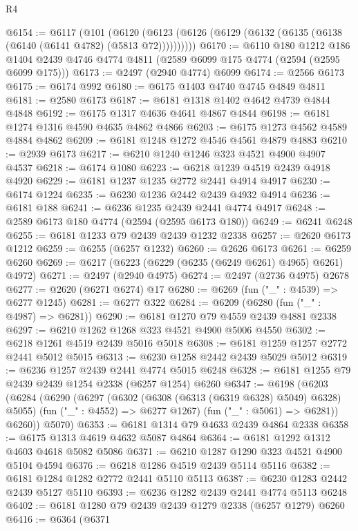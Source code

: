\begin{lexlean}{R4}
\begin{coremodule}
@6154 := @6117
    (@101 (@6120 (@6123 (@6126 (@6129 (@6132 (@6135 (@6138 (@6140 (@6141 @4782) (@5813 @72))))))))))
@6170 := @6110
    @180
    @1212
    @186
    @1404
    @2439
    @4746
    @4774
    @4811
    (@2589 @6099 @175 @4774 (@2594 (@2595 @6099 @175)))
@6173 := @2497 (@2940 @4774) @6099
@6174 := @2566 @6173
@6175 := @6174 @992
@6180 := @6175 @1403 @4740 @4745 @4849 @4811
@6181 := @2580 @6173
@6187 := @6181 @1318 @1402 @4642 @4739 @4844 @4848
@6192 := @6175 @1317 @4636 @4641 @4867 @4844
@6198 := @6181 @1274 @1316 @4590 @4635 @4862 @4866
@6203 := @6175 @1273 @4562 @4589 @4884 @4862
@6209 := @6181 @1248 @1272 @4546 @4561 @4879 @4883
@6210 := @2939 @6173
@6217 := @6210 @1240 @1246 @323 @4521 @4900 @4907 @4537
@6218 := @6174 @1080
@6223 := @6218 @1239 @4519 @2439 @4918 @4920
@6229 := @6181 @1237 @1235 @2772 @2441 @4914 @4917
@6230 := @6174 @1224
@6235 := @6230 @1236 @2442 @2439 @4932 @4914
@6236 := @6181 @188
@6241 := @6236 @1235 @2439 @2441 @4774 @4917
@6248 := @2589 @6173 @180 @4774 (@2594 (@2595 @6173 @180))
@6249 := @6241 @6248
@6255 := @6181 @1233 @79 @2439 @2439 @1232 @2338
@6257 := @2620 @6173 @1212
@6259 := @6255 (@6257 @1232)
@6260 := @2626 @6173
@6261 := @6259 @6260
@6269 := @6217 (@6223 (@6229 (@6235 (@6249 @6261) @4965) @6261) @4972)
@6271 := @2497 (@2940 @4975)
@6274 := @2497 (@2736 @4975) @2678
@6277 := @2620 (@6271 @6274) @17
@6280 := @6269 (fun ("_" : @4539) => @6277 @1245)
@6281 := @6277 @322
@6284 := @6209 (@6280 (fun ("_" : @4987) => @6281))
@6290 := @6181 @1270 @79 @4559 @2439 @4881 @2338
@6297 := @6210 @1262 @1268 @323 @4521 @4900 @5006 @4550
@6302 := @6218 @1261 @4519 @2439 @5016 @5018
@6308 := @6181 @1259 @1257 @2772 @2441 @5012 @5015
@6313 := @6230 @1258 @2442 @2439 @5029 @5012
@6319 := @6236 @1257 @2439 @2441 @4774 @5015 @6248
@6328 := @6181 @1255 @79 @2439 @2439 @1254 @2338 (@6257 @1254) @6260
@6347 := @6198
    (@6203
      (@6284
        (@6290
          (@6297
            (@6302 (@6308 (@6313 (@6319 @6328) @5049) @6328) @5055)
            (fun ("_" : @4552) => @6277 @1267)
            (fun ("_" : @5061) => @6281))
          @6260))
      @5070)
@6353 := @6181 @1314 @79 @4633 @2439 @4864 @2338
@6358 := @6175 @1313 @4619 @4632 @5087 @4864
@6364 := @6181 @1292 @1312 @4603 @4618 @5082 @5086
@6371 := @6210 @1287 @1290 @323 @4521 @4900 @5104 @4594
@6376 := @6218 @1286 @4519 @2439 @5114 @5116
@6382 := @6181 @1284 @1282 @2772 @2441 @5110 @5113
@6387 := @6230 @1283 @2442 @2439 @5127 @5110
@6393 := @6236 @1282 @2439 @2441 @4774 @5113 @6248
@6402 := @6181 @1280 @79 @2439 @2439 @1279 @2338 (@6257 @1279) @6260
@6416 := @6364
    (@6371

\end{coremodule}
\end{lexlean}
